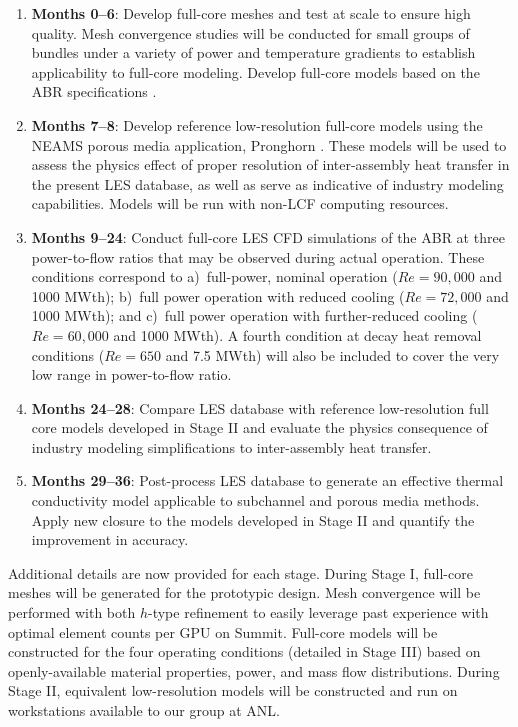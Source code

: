 \documentclass[11pt,letterpaper,english]{article}
\begin{document}
\begin{enumerate}[label=\Roman*]
\item {\bf Months 0--6}: Develop full-core meshes and test at scale to ensure high quality. Mesh convergence studies will be conducted for small groups of bundles under a variety of power and temperature gradients to establish applicability to full-core modeling. Develop full-core models based on the ABR specifications \cite{abr}.
\item {\bf Months 7--8}: Develop reference low-resolution full-core models using the NEAMS porous media application, Pronghorn \cite{novak2021b}. These models will be used to assess the physics effect of proper resolution of inter-assembly heat transfer in the present LES database, as well as serve as indicative of industry modeling capabilities. Models will be run with non-LCF computing resources.
\item {\bf Months 9--24}: Conduct full-core LES CFD simulations of the ABR at three power-to-flow ratios that may be observed during actual operation. These conditions correspond to a)~full-power, nominal operation (\(Re=90,000\) and 1000 MWth); b)~full power operation with reduced cooling (\(Re=72,000\) and 1000 MWth); and c)~full power operation with further-reduced cooling (\(Re=60,000\) and 1000 MWth). A fourth condition at decay heat removal conditions (\(Re=650\) and 7.5 MWth) will also be included to cover the very low range in power-to-flow ratio.
\item {\bf Months 24--28}: Compare LES database with reference low-resolution full core models developed in Stage II and evaluate the physics consequence of industry modeling simplifications to inter-assembly heat transfer.
\item {\bf Months 29--36}: Post-process LES database to generate an effective thermal conductivity model applicable to subchannel and porous media methods. Apply new closure to the models developed in Stage II and quantify the improvement in accuracy. 
\end{enumerate}

Additional details are now provided for each stage. During Stage I, full-core meshes will be generated for the prototypic design. Mesh convergence will be performed with both \(h\)-type refinement to easily leverage past experience with optimal element counts per GPU on Summit. Full-core models will be constructed for the four operating conditions (detailed in Stage III) based on openly-available material properties, power, and mass flow distributions. During Stage II, equivalent low-resolution models will be constructed and run on workstations available to our group at ANL. 
\end{document}
